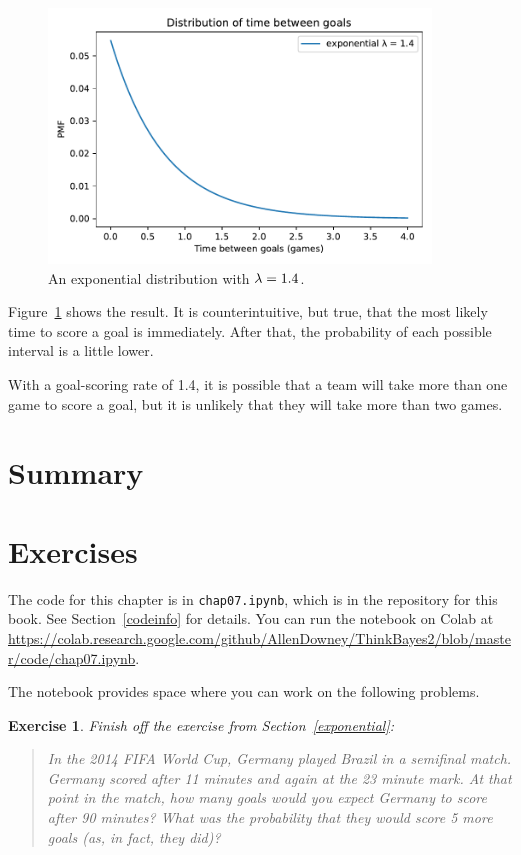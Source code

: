 \documentclass[12pt]{book}
\theoremstyle{exercise}
\newtheorem{exercise}{Exercise}[chapter]
\newcommand{\py}[1]{{\tt #1}}%
\begin{document}
\begin{figure}
\centerline{\includegraphics[width=4in]{figs/fig07-05.pdf}}
\caption{An exponential distribution with $\mathtt{\lambda} = 1.4$.}
\label{fig07-05}
\end{figure}

Figure~\ref{fig07-05} shows the result.
It is counterintuitive, but true, that the most likely time to score a goal is immediately.  After that, the probability of each possible interval is a little lower.

With a goal-scoring rate of 1.4, it is possible that a team will take more than one game to score a goal, but it is unlikely that they will take more than two games.


\section{Summary}



\section{Exercises}

The code for this chapter is in \py{chap07.ipynb}, which is in the repository for this book.  See Section~\ref{codeinfo} for details.
You can run the notebook on Colab at \url{https://colab.research.google.com/github/AllenDowney/ThinkBayes2/blob/master/code/chap07.ipynb}.

The notebook provides space where you can work on the following problems.


\begin{exercise}
Finish off the exercise from Section~\ref{exponential}:

\begin{quote}
In the 2014 FIFA World Cup, Germany played Brazil in a semifinal match. Germany scored after 11 minutes and again at the 23 minute mark.
At that point in the match, how many goals would you expect Germany to score after 90 minutes?
What was the probability that they would score 5 more goals (as, in fact, they did)?
\end{quote}

\end{exercise}
\end{document}
